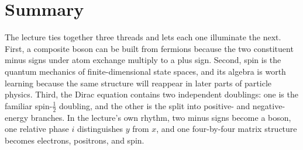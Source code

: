 \section{Summary}

The lecture ties together three threads and lets each one illuminate the next. First, a composite boson can be built from fermions because the two constituent minus signs under atom exchange multiply to a plus sign. Second, spin is the quantum mechanics of finite-dimensional state spaces, and its algebra is worth learning because the same structure will reappear in later parts of particle physics. Third, the Dirac equation contains two independent doublings: one is the familiar spin-\(\tfrac12\) doubling, and the other is the split into positive- and negative-energy branches. In the lecture's own rhythm, two minus signs become a boson, one relative phase \(i\) distinguishes \(y\) from \(x\), and one four-by-four matrix structure becomes electrons, positrons, and spin.